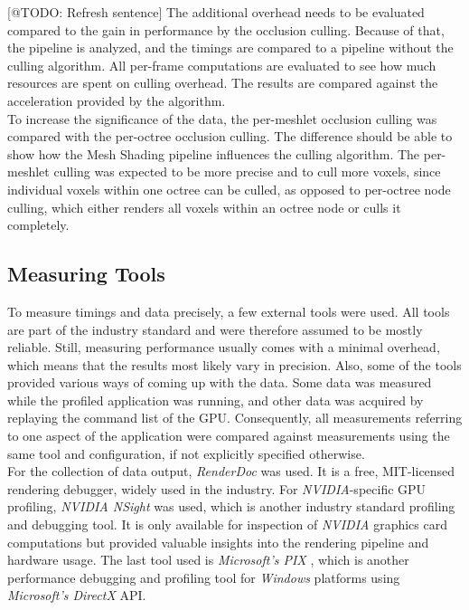[@TODO: Refresh sentence]
The additional overhead needs to be evaluated compared to the gain in performance by the occlusion culling. 
Because of that, the pipeline is analyzed, and the timings are compared to a pipeline without the culling 
algorithm. All per-frame computations are evaluated to see how much resources are spent on culling overhead. 
The results are compared against the acceleration provided by the algorithm.\\

\noindent
To increase the significance of the data, the per-meshlet occlusion culling was compared with the 
per-octree occlusion culling. The difference should be able to show how the Mesh Shading pipeline 
influences the culling algorithm. The per-meshlet culling was expected to be more precise and to cull 
more voxels, since individual voxels within one octree can be culled, as opposed to per-octree node 
culling, which either renders all voxels within an octree node or culls it completely. 


\subsection*{Measuring Tools} \label{subsec-measuring-tools}

To measure timings and data precisely, a few external tools were used. All tools are part of the industry 
standard and were therefore assumed to be mostly reliable. Still, measuring performance usually comes with 
a minimal overhead, which means that the results most likely vary in precision. Also, some of the tools 
provided various ways of coming up with the data. Some data was measured while the profiled application 
was running, and other data was acquired by replaying the command list of the \ac{GPU}. Consequently, all 
measurements referring to one aspect of the application were compared against measurements using the same 
tool and configuration, if not explicitly specified otherwise. \\

\noindent
For the collection of data output, \emph{RenderDoc} \cite{RenderDoc} was used. It is a free, MIT-licensed 
rendering debugger, widely used in the industry. For \emph{NVIDIA}-specific \ac{GPU} profiling, \emph{NVIDIA NSight} 
\cite{NSight} was used, which is another industry standard profiling and debugging tool. It is only available for 
inspection of \emph{NVIDIA} graphics card computations but provided valuable insights into the rendering pipeline 
and hardware usage. The last tool used is \emph{Microsoft's PIX} \cite{PIX}, which is another performance debugging 
and profiling tool for \emph{Windows} platforms using \emph{Microsoft's DirectX} \ac{API}. \\

